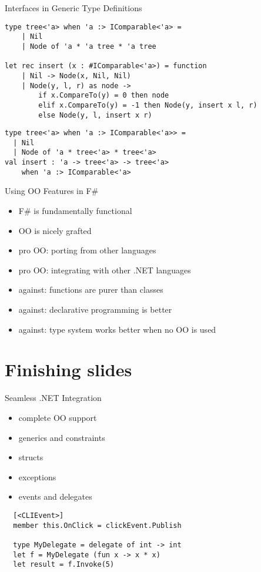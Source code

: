 \documentclass{beamer}
\begin{document}
\begin{frame}[fragile]{Interfaces in Generic Type Definitions}
  \small
  \begin{verbatim}
type tree<'a> when 'a :> IComparable<'a> =
    | Nil
    | Node of 'a * 'a tree * 'a tree

let rec insert (x : #IComparable<'a>) = function
    | Nil -> Node(x, Nil, Nil)
    | Node(y, l, r) as node ->
        if x.CompareTo(y) = 0 then node
        elif x.CompareTo(y) = -1 then Node(y, insert x l, r)
        else Node(y, l, insert x r)
  \end{verbatim}
  \pause
  \begin{verbatim}
type tree<'a> when 'a :> IComparable<'a>> =
  | Nil
  | Node of 'a * tree<'a> * tree<'a>
val insert : 'a -> tree<'a> -> tree<'a>
    when 'a :> IComparable<'a>
  \end{verbatim}
\end{frame}

\begin{frame}{Using OO Features in F\#}
  \begin{itemize}[<+->]
    \item F\# is fundamentally functional
    \item OO is nicely grafted
    \item pro OO: porting from other languages
    \item pro OO: integrating with other .NET languages
    \item against: functions are purer than classes
    \item against: declarative programming is better
    \item against: type system works better when no OO is used
  \end{itemize}
\end{frame}

\section{Finishing slides}
\frame{\tableofcontents[currentsection]}

\begin{frame}[fragile]{Seamless .NET Integration}
  \begin{itemize}[<+->]
    \item complete OO support
    \item generics and constraints
    \item structs
    \item exceptions
    \item events and delegates
  \end{itemize}
  \pause
  \begin{verbatim}
  [<CLIEvent>]
  member this.OnClick = clickEvent.Publish

  type MyDelegate = delegate of int -> int
  let f = MyDelegate (fun x -> x * x)
  let result = f.Invoke(5)
  \end{verbatim}
\end{frame}
\end{document}
